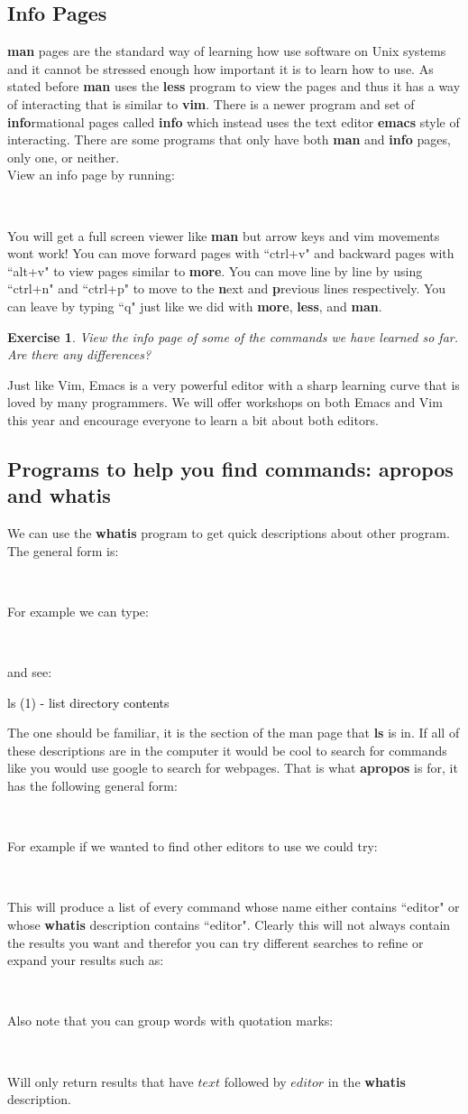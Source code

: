 \documentclass[oneside]{book}
\newcommand{\commandline}[1]{\begin{center} \colorbox{Dark}{\textcolor{white}{#1}} \end{center}}
\newcommand{\exampleout}[1]{\begin{center} \colorbox{Light}{\textcolor{black}{#1}} \end{center}}
\newtheorem{ex}{Exercise}[chapter]
\begin{document}
\subsection{Info Pages}
\textbf{man} pages are the standard way of learning how use software on Unix systems and it cannot be stressed enough how important it is to learn how to use. As stated before \textbf{man} uses the \textbf{less} program to view the pages and thus it has a way of interacting that is similar to \textbf{vim}. There is a newer program and set of \textbf{info}rmational pages called \textbf{info} which instead uses the text editor \textbf{emacs} style of interacting. There are some programs that only have both \textbf{man} and \textbf{info} pages, only one, or neither. \\
View an info page by running:
\commandline{info program\_name}
You will get a full screen viewer like \textbf{man} but arrow keys and vim movements wont work! You can move forward pages with ``ctrl+v" and backward pages with ``alt+v" to view pages similar to \textbf{more}. You can move line by line by using ``ctrl+n" and ``ctrl+p" to move to the \textbf{n}ext and \textbf{p}revious lines respectively. You can leave by typing ``q" just like we did with \textbf{more}, \textbf{less}, and \textbf{man}. \\
\begin{ex}
	View the info page of some of the commands we have learned so far. Are there any differences? 
\end{ex}
Just like Vim, Emacs is a very powerful editor with a sharp learning curve that is loved by many programmers. We will offer workshops on both Emacs and Vim this year and encourage everyone to learn a bit about both editors. 

\subsection{Programs to help you find commands: \textbf{apropos} and \textbf{whatis}}
We can use the \textbf{whatis} program to get quick descriptions about other program. The general form is:
\commandline{whatis programname}
For example we can type:
\commandline{whatis ls}
and see:
\exampleout{ls (1)		- list directory contents}
The one should be familiar, it is the section of the man page that \textbf{ls} is in. If all of these descriptions are in the computer it would be cool to search for commands like you would use google to search for webpages.
That is what \textbf{apropos} is for, it has the following general form:
\commandline{apropos whatToSearchFor}
For example if we wanted to find other editors to use we could try:
\commandline{apropos editor}
This will produce a list of every command whose name either contains ``editor" or whose \textbf{whatis} description contains ``editor". Clearly this will not always contain the results you want and therefor you can try different searches to refine or expand your results such as:
\commandline{apropos text editor}
Also note that you can group words with quotation marks:
\commandline{apropos ``text editor"} 
Will only return results that have $text$ followed by $editor$ in the \textbf{whatis} description.
\end{document}
